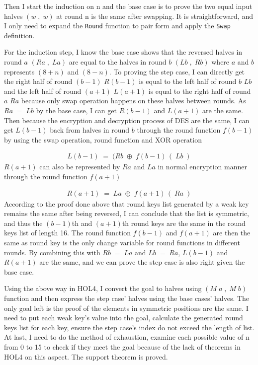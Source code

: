 \documentclass{article}
\begin{document}
Then I start the induction on n and the base case is to prove the two equal input halves $(w\;,\;w)$ at round n is the same after
swapping. It is straightforward, and I only need to expand the \verb|Round| function to pair form and apply the \verb|Swap| definition.

For the induction step, I know the base case shows that the reversed halves in round $a$ $(Ra\;,\; La)$ are equal to
the halves in round $b$ $(Lb\;,\;Rb)$ where $a$ and $b$ represents $(8+n)$ and $(8-n)$.
To proving the step case, I can directly get the right half of round $(b-1)$ $R(b-1)$ is equal to the left half of round $b$
$Lb$ and
the left half of round $(a+1)$ $L(a+1)$ is equal to the right half of round $a$ $Ra$ because only swap operation happens on
these halves between rounds. As $Ra\;= \; Lb$ by the base case, I can get $R(b-1)$ and $L(a+1)$ are the same.
Then because the encryption and decryption process of DES are the same, I can get $L(b-1)$ back from halves in round $b$ through
the round function $f(b-1)$ by using the swap operation, round function and XOR operation

\begin{equation*}
\begin{split}
   L(b-1) \; = \; (Rb \; \oplus \; f(b-1)\,(\;Lb\;)
\end{split}
\end{equation*}
$R(a+1)$ can also be represented by $Ra$ and $La$ in normal encryption manner through the round function $f(a+1)$

\begin{equation*}
\begin{split}
   R(a+1) \; = \; La \; \oplus \; f(a+1)\,(\;Ra\;)
\end{split}
\end{equation*}
According to the proof
done above that round keys list generated by a weak key remains the same after being reversed, I can conclude that the list
is  symmetric, and thus the $(b-1)$th and $(a+1)$th round keys are the same in the round keys list of length 16.
The round function $f(b-1)$ and $f(a+1)$ are then the same as round key is the only change variable for round functions in different
rounds. By combining this with $Rb\;= \; La$ and $Lb\;= \; Ra$, $L(b-1)$ and $R(a+1)$ are the same, and we can prove the step
case is also right given the base case.

Using the above way in HOL4, I convert the goal to halves using $(M\;a\;,\;M\;b)$ function and then
express the step case' halves using the base cases' halves. The only goal left is the proof of the elements in
symmetric positions are the same. I need to put each weak key's value into the goal, calculate the generated
round keys list for each key, ensure the step case's index do not exceed the length of list. At last, I need to
do the method of exhaustion, examine each possible value of n from 0 to 15 to check if they meet the goal because of
the lack of theorems in HOL4 on this aspect. The support theorem is proved.
\end{document}
